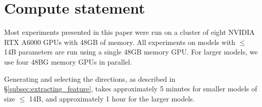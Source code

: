 \documentclass{article}
\begin{document}
\section{Compute statement}
\label{apdx:compute}

Most experiments presented in this paper  were run on a cluster of eight NVIDIA RTX A6000 GPUs with 48GB of memory.
All experiments on models with $\leq$ 14B parameters are run using a single 48GB memory GPU. For larger models, we use four 48BG memory GPUs in parallel.

Generating and selecting the directions, as described in \S\ref{subsec:extracting_feature}, takes approximately 5 minutes for smaller models of size $\leq$ 14B, and approximately 1 hour for the larger models.


% 
\end{document}
